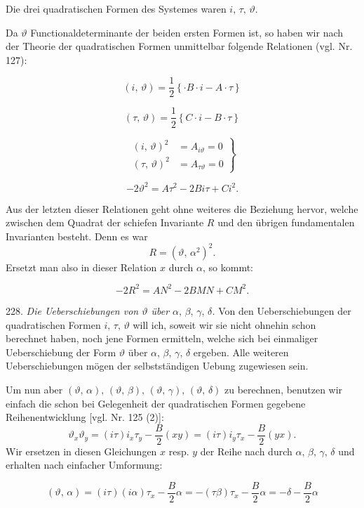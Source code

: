 \documentclass[11pt]{article}
\providecommand{\weberpage}[1]{}
\providecommand{\weq}[2]{\begin{equation}\tag{#1}#2\end{equation}}
\begin{document}
Die drei quadratischen Formen des Systemes waren $i,\,\tau,\,\vartheta$.


\weberpage{252}

Da $\vartheta$ Functionaldeterminante der beiden ersten Formen ist, so haben wir nach der Theorie der quadratischen Formen unmittelbar folgende Relationen (vgl. Nr. 127):

\weq{1}{(i,\,\vartheta) = \frac{1}{2}\left\{\cdot B\cdot i - A\cdot\tau\right\}} %

\weq{2}{(\tau,\,\vartheta) = \frac{1}{2}\left\{C\cdot i - B\cdot\tau\right\}}

\weq{2a}{\left.\begin{aligned}
(i,\,\vartheta)^2 &= A_{i\vartheta} = 0\\
(\tau,\,\vartheta)^2 &= A_{\tau\vartheta} = 0
\end{aligned}\right\}}

\weq{3}{-2\vartheta^2 = A\tau^2 - 2Bi\tau + Ci^2.}

Aus der letzten dieser Relationen geht ohne weiteres die Beziehung hervor, welche zwischen dem Quadrat der schiefen Invariante $R$ und den übrigen fundamentalen Invarianten besteht. Denn es war
\[
R = (\vartheta,\,\alpha^2)^2.
\]
Ersetzt man also in dieser Relation $x$ durch $\alpha$, so kommt:

\weq{4}{-2R^2 = AN^2 - 2BMN + CM^2.}

228. \textit{Die Ueberschiebungen von $\vartheta$ über $\alpha,\,\beta,\,\gamma,\,\delta$.} Von den Ueberschiebungen der quadratischen Formen $i,\,\tau,\,\vartheta$ will ich, soweit wir sie nicht ohnehin schon berechnet haben, noch jene Formen ermitteln, welche sich bei einmaliger Ueberschiebung der Form $\vartheta$ über $\alpha,\,\beta,\,\gamma,\,\delta$ ergeben. Alle weiteren Ueberschiebungen mögen der selbstständigen Uebung zugewiesen sein.

Um nun aber $(\vartheta,\,\alpha),\,(\vartheta,\,\beta),\,(\vartheta,\,\gamma),\,(\vartheta,\,\delta)$ zu berechnen, benutzen wir einfach die schon bei Gelegenheit der quadratischen Formen gegebene Reihenentwicklung [vgl. Nr. 125 (2)]:
\[
\vartheta_x\vartheta_y = (i\tau)i_x\tau_y - \frac{B}{2}(xy) = (i\tau)i_y\tau_x - \frac{B}{2}(yx).
\]
Wir ersetzen in diesen Gleichungen $x$ resp. $y$ der Reihe nach durch $\alpha,\,\beta,\,\gamma,\,\delta$ und erhalten nach einfacher Umformung:

\weq{1}{(\vartheta,\,\alpha) = (i\tau)(i\alpha)\tau_x - \frac{B}{2}\alpha = -(\tau\beta)\tau_x - \frac{B}{2}\alpha = -\delta - \frac{B}{2}\alpha}
\end{document}
